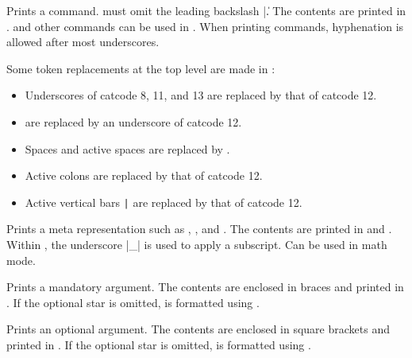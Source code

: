 \documentclass{beerydoc}
\begin{document}
\begin{codedoc}{\cs}
  \begin{syntax}
     
  \end{syntax}
  Prints a command.
   must omit the leading backslash |\|.
  The contents are printed in .
   and other commands can be used in .
  When printing  commands, hyphenation is allowed after most
  underscores.

  Some token replacements at the top level are made in :
  \begin{itemize}
    \item
    Underscores of catcode 8, 11, and 13 are replaced by that of catcode 12.
    \item \cs{_} are replaced by an underscore of catcode 12.
    \item Spaces and active spaces are replaced by .
    \item Active colons are replaced by that of catcode 12.
    \item
    Active vertical bars \texttt{\string|} are replaced by that of catcode 12.
  \end{itemize}
\end{codedoc}

\begin{codedoc}{\meta}
  \begin{syntax}
     
  \end{syntax}
  Prints a meta representation such as , , and
  .
  The contents are printed in  and .
  Within , the underscore |_| is used to apply a subscript.
  Can be used in math mode.
\end{codedoc}

\begin{codedoc}{\marg}
  \begin{syntax}
     \sarg{} 
  \end{syntax}
  Prints a mandatory argument.
  The contents are enclosed in braces and printed in .
  If the optional star is omitted,  is formatted using
  .
\end{codedoc}

\begin{codedoc}{\oarg}
  \begin{syntax}
     \sarg{} 
  \end{syntax}
  Prints an optional argument.
  The contents are enclosed in square brackets and printed in .
  If the optional star is omitted,  is formatted using
  .
\end{codedoc}
\end{document}
